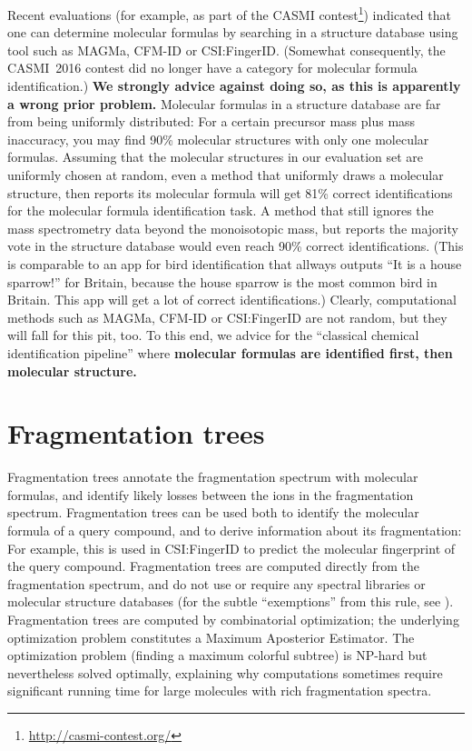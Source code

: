 \documentclass[letterpaper,10pt,openany,oneside]{sphinxmanual}
\begin{document}
Recent evaluations (for example, as part of the CASMI
contest\footnote{\sphinxAtStartFootnote\url{http://casmi-contest.org/}})
indicated that one can determine molecular formulas by searching in a
structure database using tool such as MAGMa, CFM-ID or CSI:FingerID.
(Somewhat consequently, the CASMI~2016 contest did no longer have a category
for molecular formula identification.)  \textbf{We strongly advice against
doing so, as this is apparently a wrong prior problem.}  Molecular formulas
in a structure database are far from being uniformly distributed: For a
certain precursor mass plus mass inaccuracy, you may find 90\% molecular
structures with only one molecular formulas.  Assuming that the molecular
structures in our evaluation set are uniformly chosen at random, even a
method that uniformly draws a molecular structure, then reports its molecular
formula will get 81\% correct identifications for the molecular formula
identification task.  A method that still ignores the mass spectrometry data
beyond the monoisotopic mass, but reports the majority vote in the structure
database would even reach 90\% correct identifications.  (This is comparable
to an app for bird identification that allways outputs ``It is a house
sparrow!'' for Britain, because the house sparrow is the most common bird in
Britain.  This app will get a lot of correct identifications.)  Clearly,
computational methods such as MAGMa, CFM-ID or CSI:FingerID are not random,
but they will fall for this pit, too.  To this end, we advice for the
``classical chemical identification pipeline'' where \textbf{molecular
formulas are identified first, then molecular structure.}



\section{Fragmentation trees}

Fragmentation trees annotate the fragmentation spectrum with molecular
formulas, and identify likely losses between the ions in the fragmentation
spectrum.  Fragmentation trees can be used both to identify the molecular
formula of a query compound, and to derive information about its
fragmentation: For example, this is used in CSI:FingerID to predict the
molecular fingerprint of the query compound.  Fragmentation trees are
computed directly from the fragmentation spectrum, and do not use or require
any spectral libraries or molecular structure databases (for the subtle
``exemptions'' from this rule, see \citet{boecker16fragmentation}).
Fragmentation trees are computed by combinatorial optimization; the
underlying optimization problem constitutes a Maximum Aposterior Estimator.
The optimization problem (finding a maximum colorful subtree) is NP-hard but
nevertheless solved optimally, explaining why computations sometimes require
significant running time for large molecules with rich fragmentation spectra.
\end{document}
